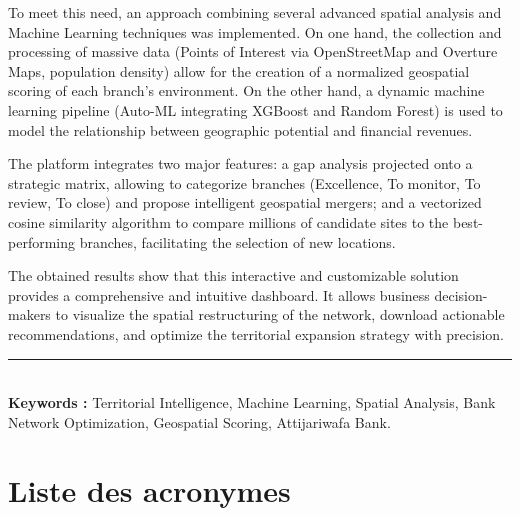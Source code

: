 \documentclass[11pt,a4paper,twoside]{report}
\begin{document}
To meet this need, an approach combining several advanced spatial analysis and Machine Learning techniques was implemented. On one hand, the collection and processing of massive data (Points of Interest via OpenStreetMap and Overture Maps, population density) allow for the creation of a normalized geospatial scoring of each branch's environment. On the other hand, a dynamic machine learning pipeline (Auto-ML integrating XGBoost and Random Forest) is used to model the relationship between geographic potential and financial revenues.

The platform integrates two major features: a gap analysis projected onto a strategic matrix, allowing to categorize branches (Excellence, To monitor, To review, To close) and propose intelligent geospatial mergers; and a vectorized cosine similarity algorithm to compare millions of candidate sites to the best-performing branches, facilitating the selection of new locations.

The obtained results show that this interactive and customizable solution provides a comprehensive and intuitive dashboard. It allows business decision-makers to visualize the spatial restructuring of the network, download actionable recommendations, and optimize the territorial expansion strategy with precision.

\vspace{\fill}
\noindent\rule{\textwidth}{0.4pt} \\
\textbf{Keywords :} Territorial Intelligence, Machine Learning, Spatial Analysis, Bank Network Optimization, Geospatial Scoring, Attijariwafa Bank.

\newpage

\tableofcontents
\newpage

\listoffigures
\newpage

\listoftables
\newpage

\chapter*{Liste des acronymes}
\end{document}
